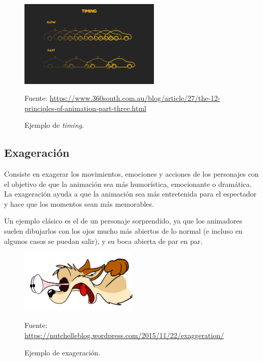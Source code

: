 \documentclass{article}
\begin{document}
\begin{figure}[H]
    \centering
    \includegraphics[width=0.6\textwidth]{imagenes/image-9_timing.jpg}
    \caption{Ejemplo de \textit{timing}.}
    \vspace{10pt}
    \footnotesize{Fuente: \url{https://www.360south.com.au/blog/article/27/the-12-principles-of-animation-part-three.html}}
\end{figure}

\subsection{Exageración}

Consiste en exagerar los movimientos, emociones y acciones de los personajes con el objetivo de que la animación sea más humorística, emocionante o dramática. La exageración ayuda a que la animación sea más entretenida para el espectador y hace que los momentos sean más memorables.

\bigskip

Un ejemplo clásico es el de un personaje sorprendido, ya que los animadores suelen dibujarlos con los ojos mucho más abiertos de lo normal (e incluso en algunos casos se puedan salir), y su boca abierta de par en par.

\begin{figure}[H]
    \centering
    \includegraphics[width=0.5\textwidth]{imagenes/080104_eyes.jpg}
    \caption{Ejemplo de exageración.}
    \vspace{10pt}
    \footnotesize{Fuente: \url{https://nutchelleblog.wordpress.com/2015/11/22/exaggeration/}}
\end{figure}
\end{document}
